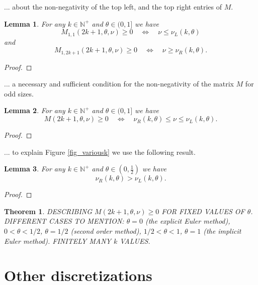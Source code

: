 \documentclass[a4paper]{article}
\newtheorem{theorem}{Theorem}
\newtheorem{lemma}{Lemma}
\newcommand{\te}{\theta}
\newcommand{\nul}{\nu_L(k,\theta)}
\newcommand{\nur}{\nu_R(k,\theta)}
\newcommand{\nplus}{\mathbb{N}^+}
\begin{document}
... about the non-negativity of the top left, and the top right entries of $M$.
\begin{lemma}
For any $k\in\nplus$ and $\te\in(0,1]$ we have 
\[
M_{1,1}(2k+1,\te,\nu)\ge 0 \quad \Longleftrightarrow \quad \nu\le\nul
\] 
and
\[
M_{1,2k+1}(2k+1,\te,\nu)\ge 0 \quad \Longleftrightarrow \quad \nu\ge\nur.
\] 
\end{lemma}
\begin{proof}
\end{proof}



... a necessary and sufficient condition for the non-negativity of the matrix $M$ for odd sizes.
\begin{lemma}
For any $k\in\nplus$ and $\te\in(0,1]$ we have 
\[
M(2k+1,\te,\nu)\ge 0 \quad \Longleftrightarrow \quad \nur\le\nu\le\nul.
\] 
\end{lemma}
\begin{proof}
\end{proof}


... to explain Figure \ref{fig_variousk} we use the following result.
\begin{lemma}
For any $k\in\nplus$ and $\te\in\left(0,\frac{1}{2}\right)$ we have 
\[
 \nur>\nul.
\] 
\end{lemma}
\begin{proof}
\end{proof}

\begin{theorem}
DESCRIBING $M(2k+1,\te,\nu)\ge 0 $ FOR FIXED VALUES OF $\te$.
DIFFERENT CASES TO MENTION:
$\te=0$ (the explicit Euler method), $0<\te<1/2$, $\te=1/2$ (second order method), $1/2<\te<1$, $\te=1$ (the implicit Euler method). FINITELY MANY $k$ VALUES.
\end{theorem}






\section{Other discretizations}
\end{document}
